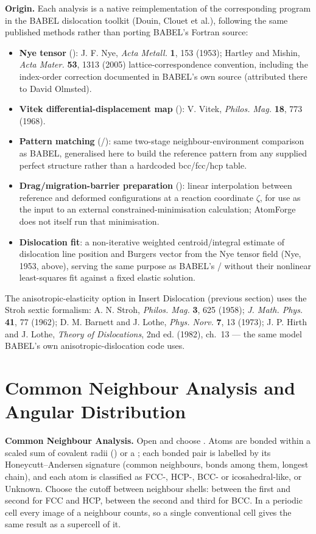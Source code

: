 \textbf{Origin.} Each analysis is a native reimplementation of the corresponding program in the BABEL dislocation toolkit (Douin, Clouet et al.), following the same published methods rather than porting BABEL's Fortran source:
\begin{itemize}
\item \textbf{Nye tensor} (): J. F. Nye, \textit{Acta Metall.} \textbf{1}, 153 (1953); Hartley and Mishin, \textit{Acta Mater.} \textbf{53}, 1313 (2005) lattice-correspondence convention, including the index-order correction documented in BABEL's own source (attributed there to David Olmsted).
\item \textbf{Vitek differential-displacement map} (): V. Vitek, \textit{Philos. Mag.} \textbf{18}, 773 (1968).
\item \textbf{Pattern matching} (/): same two-stage neighbour-environment comparison as BABEL, generalised here to build the reference pattern from any supplied perfect structure rather than a hardcoded bcc/fcc/hcp table.
\item \textbf{Drag/migration-barrier preparation} (): linear interpolation between reference and deformed configurations at a reaction coordinate $\zeta$, for use as the input to an external constrained-minimisation calculation; AtomForge does not itself run that minimisation.
\item \textbf{Dislocation fit}: a non-iterative weighted centroid/integral estimate of dislocation line position and Burgers vector from the Nye tensor field (Nye, 1953, above), serving the same purpose as BABEL's / without their nonlinear least-squares fit against a fixed elastic solution.
\end{itemize}
The anisotropic-elasticity option in Insert Dislocation (previous section) uses the Stroh sextic formalism: A. N. Stroh, \textit{Philos. Mag.} \textbf{3}, 625 (1958); \textit{J. Math. Phys.} \textbf{41}, 77 (1962); D. M. Barnett and J. Lothe, \textit{Phys. Norv.} \textbf{7}, 13 (1973); J. P. Hirth and J. Lothe, \textit{Theory of Dislocations}, 2nd ed. (1982), ch.\ 13 --- the same model BABEL's own anisotropic-dislocation code uses.

\section{Common Neighbour Analysis and Angular Distribution}
\textbf{Common Neighbour Analysis.} Open  and choose . Atoms are bonded within a scaled sum of covalent radii () or a ; each bonded pair is labelled by its Honeycutt--Andersen signature (common neighbours, bonds among them, longest chain), and each atom is classified as FCC-, HCP-, BCC- or icosahedral-like, or Unknown. Choose the cutoff between neighbour shells: between the first and second for FCC and HCP, between the second and third for BCC. In a periodic cell every image of a neighbour counts, so a single conventional cell gives the same result as a supercell of it.

